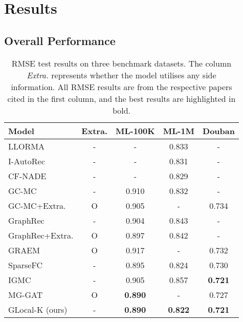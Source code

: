 \documentclass[sigconf]{acmart}
\begin{document}
\section{Results}
\subsection{Overall Performance}
\begin{table}[t]
\caption{RMSE test results on three benchmark datasets. The column \textit{Extra.} represents whether the model utilises any side information. All RMSE results are from the respective papers cited in the first column, and the best results are highlighted in bold.}
\vspace{-0.3cm}
\label{tab:RMSE_results}
{\small
\begin{tabular}{lcccc}
\hline
\textbf{Model} & \textbf{Extra.} & \multicolumn{1}{c}{\textbf{ML-100K}} & \multicolumn{1}{c}{\textbf{ML-1M}} & \multicolumn{1}{c}{\textbf{Douban}} \\ \hline
LLORMA\cite{lee2016llorma} & - & - & 0.833 & - \\
I-AutoRec\cite{sedhain2015autorec} & - & - & 0.831 & - \\
CF-NADE\cite{zheng2016neural} & - & - & 0.829 & - \\
GC-MC\cite{berg2018graph} & - & 0.910 & 0.832 & - \\
GC-MC+Extra.\cite{berg2018graph} & O & 0.905 & - & 0.734 \\
GraphRec\cite{rashed2019attribute} & - & 0.904 & 0.843 & - \\
GraphRec+Extra.\cite{rashed2019attribute} & O & 0.897 & 0.842 & - \\
GRAEM\cite{strahl2020scalable} & O & 0.917 & - & 0.732 \\
SparseFC\cite{muller2018kernelized} & - & 0.895 & 0.824 & 0.730 \\
IGMC\cite{zhang2019inductive} & - & 0.905 & 0.857 & \textbf{0.721} \\
MG-GAT\cite{ugla2020interpretable} & O & \textbf{0.890} & - & 0.727 \\
GLocal-K (ours) & - & \textbf{0.890} & \textbf{0.822} & \textbf{0.721} \\ \hline
\end{tabular}
}
\vspace{-4mm}
\end{table}
\end{document}
